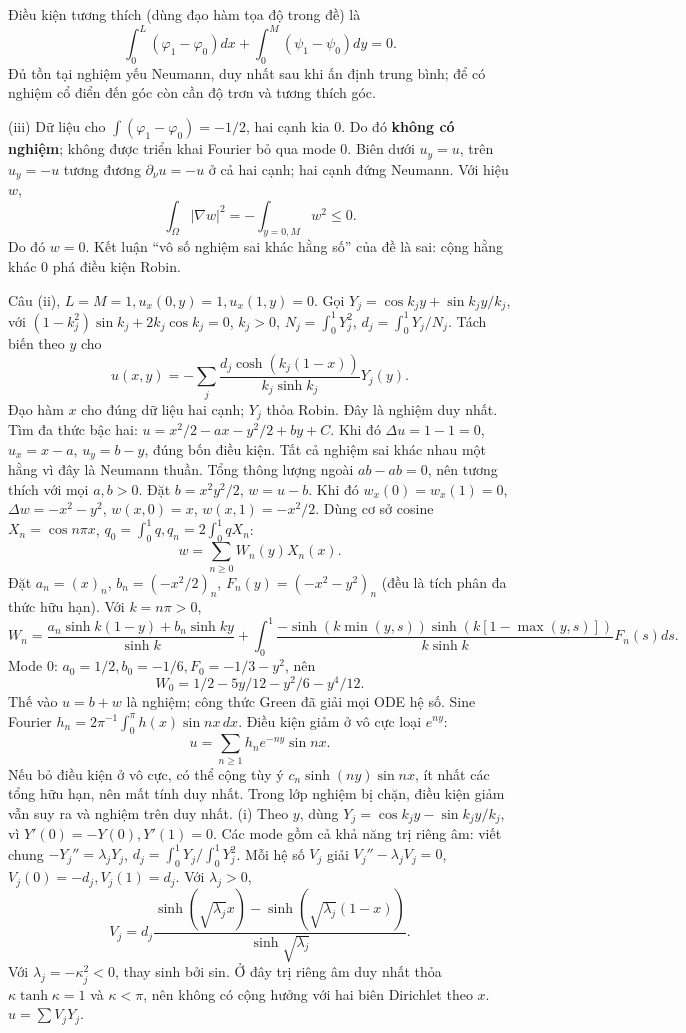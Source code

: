 Điều kiện tương thích (dùng đạo hàm tọa độ trong đề) là
\[\int_0^L(\varphi_1-\varphi_0)dx+\int_0^M(\psi_1-\psi_0)dy=0.\]
Đủ tồn tại nghiệm yếu Neumann, duy nhất sau khi ấn định trung bình; để có nghiệm cổ điển đến góc còn cần độ trơn và tương thích góc.

(iii) Dữ liệu cho $\int(\varphi_1-\varphi_0)=-1/2$, hai cạnh kia 0. Do đó \textbf{không có nghiệm}; không được triển khai Fourier bỏ qua mode 0.
Biên dưới $u_y=u$, trên $u_y=-u$ tương đương $\partial_\nu u=-u$ ở cả hai cạnh; hai cạnh đứng Neumann. Với hiệu $w$,
\[\int_\Omega|\nabla w|^2=-\int_{y=0,M}w^2\le0.\]
Do đó $w=0$. Kết luận ``vô số nghiệm sai khác hằng số'' của đề là sai: cộng hằng khác 0 phá điều kiện Robin.

Câu (ii), $L=M=1,u_x(0,y)=1,u_x(1,y)=0$. Gọi $Y_j=\cos k_jy+\sin k_jy/k_j$, với $(1-k_j^2)\sin k_j+2k_j\cos k_j=0$, $k_j>0$, $N_j=\int_0^1Y_j^2$, $d_j=\int_0^1Y_j/N_j$. Tách biến theo $y$ cho
\[u(x,y)=-\sum_j\frac{d_j\cosh(k_j(1-x))}{k_j\sinh k_j}Y_j(y).\]
Đạo hàm $x$ cho đúng dữ liệu hai cạnh; $Y_j$ thỏa Robin. Đây là nghiệm duy nhất.
Tìm đa thức bậc hai: $u=x^2/2-ax-y^2/2+by+C$. Khi đó $\Delta u=1-1=0$, $u_x=x-a$, $u_y=b-y$, đúng bốn điều kiện. Tất cả nghiệm sai khác nhau một hằng vì đây là Neumann thuần. Tổng thông lượng ngoài $ab-ab=0$, nên tương thích với mọi $a,b>0$.
Đặt $b=x^2y^2/2$, $w=u-b$. Khi đó $w_x(0)=w_x(1)=0$, $\Delta w=-x^2-y^2$, $w(x,0)=x$, $w(x,1)=-x^2/2$. Dùng cơ sở cosine $X_n=\cos n\pi x$, $q_0=\int_0^1q,q_n=2\int_0^1qX_n$:
\[w=\sum_{n\ge0}W_n(y)X_n(x).\]
Đặt $a_n=(x)_n$, $b_n=(-x^2/2)_n$, $F_n(y)=(-x^2-y^2)_n$ (đều là tích phân đa thức hữu hạn). Với $k=n\pi>0$,
\[W_n=\frac{a_n\sinh k(1-y)+b_n\sinh ky}{\sinh k}+\int_0^1\frac{-\sinh(k\min(y,s))\sinh(k[1-\max(y,s)])}{k\sinh k}F_n(s)ds.\]
Mode 0: $a_0=1/2,b_0=-1/6,F_0=-1/3-y^2$, nên
\[W_0=1/2-5y/12-y^2/6-y^4/12.\]
Thế vào $u=b+w$ là nghiệm; công thức Green đã giải mọi ODE hệ số.
Sine Fourier $h_n=2\pi^{-1}\int_0^\pi h(x)\sin nx\,dx$. Điều kiện giảm ở vô cực loại $e^{ny}$:
\[u=\sum_{n\ge1}h_ne^{-ny}\sin nx.\]
Nếu bỏ điều kiện ở vô cực, có thể cộng tùy ý $c_n\sinh(ny)\sin nx$, ít nhất các tổng hữu hạn, nên mất tính duy nhất. Trong lớp nghiệm bị chặn, điều kiện giảm vẫn suy ra và nghiệm trên duy nhất.
(i) Theo $y$, dùng $Y_j=\cos k_jy-\sin k_jy/k_j$, vì $Y'(0)=-Y(0),Y'(1)=0$. Các mode gồm cả khả năng trị riêng âm: viết chung $-Y_j''=\lambda_jY_j$, $d_j=\int_0^1Y_j/\int_0^1Y_j^2$. Mỗi hệ số $V_j$ giải $V_j''-\lambda_jV_j=0$, $V_j(0)=-d_j,V_j(1)=d_j$. Với $\lambda_j>0$,
\[V_j=d_j\frac{\sinh(\sqrt{\lambda_j}x)-\sinh(\sqrt{\lambda_j}(1-x))}{\sinh\sqrt{\lambda_j}}.\]
Với $\lambda_j=-\kappa_j^2<0$, thay sinh bởi sin. Ở đây trị riêng âm duy nhất thỏa $\kappa\tanh\kappa=1$ và $\kappa<\pi$, nên không có cộng hưởng với hai biên Dirichlet theo $x$. $u=\sum V_jY_j$.

